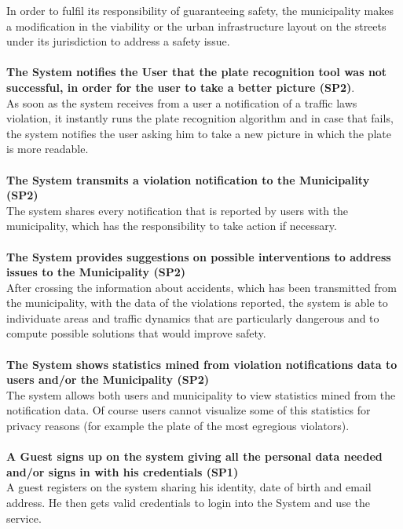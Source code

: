 \documentclass {article}
\begin{document}
		In order to fulfil its responsibility of guaranteeing safety, the municipality makes a modification in the viability or the urban infrastructure layout on the streets under its jurisdiction to address a safety issue.\\ \\
	{\bf The System notifies the User that the plate recognition tool was not successful, in order for the user to take a better picture (SP2)}. \\
		As soon as the system receives from a user a notification of a traffic laws violation, it instantly runs the plate recognition algorithm and in case that fails, the system notifies the user asking him to take a new picture in which the plate is more readable. \\ \\
	{\bf The System transmits a violation notification to the Municipality (SP2)} \\
		The system shares every notification that is reported by users with the municipality, which has the responsibility to take action if necessary.\\ \\
	{\bf The System provides suggestions on possible interventions to address issues to the Municipality (SP2)} \\
		After crossing the information about accidents, which has been transmitted from the municipality, with the data of the violations reported, the system is able to individuate areas and traffic dynamics that are particularly dangerous and to compute possible solutions that would improve safety. \\ \\
	{\bf The System shows statistics mined from violation notifications data to users and/or the Municipality (SP2)} \\
		The system allows both users and municipality to view statistics mined from the notification data. Of course users cannot visualize some of this statistics for privacy reasons (for example the plate of the most egregious violators). \\ \\
	{\bf A Guest signs up on the system giving all the personal data needed and/or signs in with his credentials  (SP1)} \\
		A guest registers on the system sharing his identity, date of birth and email address. He then gets valid credentials to login into the System and use the service. \\ \\
\end{document}
